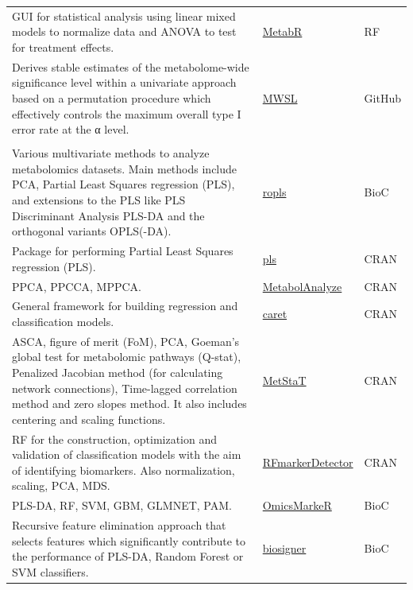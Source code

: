 \documentclass[]{article}
\begin{document}
\begin{longtable}{>{\raggedright\arraybackslash}p{30em}>{\raggedright\arraybackslash}p{10em}>{\raggedright\arraybackslash}p{3em}}
\rowcolor{gray!6}  GUI for statistical analysis using linear mixed models to normalize data and ANOVA to test for treatment effects. & \href{http://metabr.r-forge.r-project.org/}{MetabR} & RF\\
Derives stable estimates of the metabolome-wide significance level within a univariate approach based on a permutation procedure which effectively controls the maximum overall type I error rate at the α level. & \href{https://github.com/AlinaPeluso/MWSL}{MWSL} & GitHub\\
\rowcolor{gray!6}  \addlinespace[0.3em]
\multicolumn{3}{l}{\textbf{Multivariate modeling and feature selection}}\\
Various multivariate methods to analyze metabolomics datasets. Main methods include PCA, Partial Least Squares regression (PLS), and extensions to the PLS like PLS Discriminant Analysis PLS-DA and the orthogonal variants OPLS(-DA). & \href{http://bioconductor.org/packages/release/bioc/html/ropls.html}{ropls} & BioC\\
Package for performing Partial Least Squares regression (PLS). & \href{https://cran.r-project.org/package=pls}{pls} & CRAN\\
\rowcolor{gray!6}  PPCA, PPCCA, MPPCA. & \href{https://cran.r-project.org/package=MetabolAnalyze}{MetabolAnalyze} & CRAN\\
General framework for building regression and classification models. & \href{https://cran.r-project.org/package=caret}{caret} & CRAN\\
\rowcolor{gray!6}  ASCA, figure of merit (FoM), PCA, Goeman’s global test for metabolomic pathways (Q-stat), Penalized Jacobian method (for calculating network connections), Time-lagged correlation method and zero slopes method. It also includes centering and scaling functions. & \href{https://cran.r-project.org/package=MetStaT}{MetStaT} & CRAN\\
RF for the construction, optimization and validation of classification models with the aim of identifying biomarkers. Also normalization, scaling, PCA, MDS. & \href{https://cran.r-project.org/package=RFmarkerDetector}{RFmarkerDetector} & CRAN\\
\rowcolor{gray!6}  PLS-DA, RF, SVM, GBM, GLMNET, PAM. & \href{http://bioconductor.org/packages/release/bioc/html/OmicsMarkeR.html}{OmicsMarkeR} & BioC\\
Recursive feature elimination approach that selects features which significantly contribute to the performance of PLS-DA, Random Forest or SVM classifiers. & \href{http://bioconductor.org/packages/release/bioc/html/biosigner.html}{biosigner} & BioC\\

\end{longtable}
\end{document}
